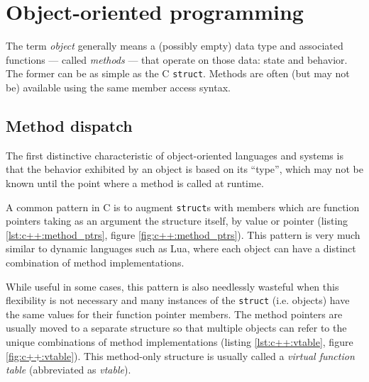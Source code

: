 \section{Object-oriented programming}

\label{sec:c++:oop}

The term \textit{object} generally means a (possibly empty) data type and
associated functions --- called \textit{methods} --- that operate on those data:
state and behavior\footnotemark.  The former can be as simple as the C
\texttt{struct}.  Methods are often (but may not be) available using the same
member access syntax.


\subsection{Method dispatch}

The first distinctive characteristic of object-oriented languages and systems is
that the behavior exhibited by an object is based on its ``type'', which may not
be known until the point where a method is called at runtime.

A common pattern in C is to augment \texttt{struct}s with members which are
function pointers taking as an argument the structure itself, by value or
pointer (listing \ref{lst:c++:method_ptrs}, figure \ref{fig:c++:method_ptrs}).
This pattern is very much similar to dynamic languages such as Lua, where each
object can have a distinct combination of method implementations.

While useful in some cases, this pattern is also needlessly wasteful when this
flexibility is not necessary and many instances of the \texttt{struct} (i.e.
objects) have the same values for their function pointer members.  The method
pointers are usually moved to a separate structure so that multiple objects can
refer to the unique combinations of method implementations (listing
\ref{lst:c++:vtable}, figure \ref{fig:c++:vtable}).  This method-only structure
is usually called a \textit{virtual function table} (abbreviated as
\textit{vtable}).

